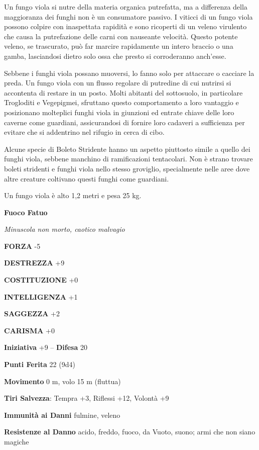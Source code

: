 \begin{multicols}{2}
	Un fungo viola si nutre della materia organica putrefatta, ma a differenza della maggioranza dei funghi non è un consumatore passivo. I viticci di un fungo viola possono colpire con inaspettata rapidità e sono ricoperti di un veleno virulento che causa la putrefazione delle carni con nauseante velocità. Questo potente veleno, se trascurato, può far marcire rapidamente un intero braccio o una gamba, lasciandosi dietro solo ossa che presto si corroderanno anch'esse.

	Sebbene i funghi viola possano muoversi, lo fanno solo per attaccare o cacciare la preda. Un fungo viola con un flusso regolare di putredine di cui nutrirsi si accontenta di restare in un posto. Molti abitanti del sottosuolo, in particolare Trogloditi e Vegepigmei, sfruttano questo comportamento a loro vantaggio e posizionano molteplici funghi viola in giunzioni ed entrate chiave delle loro caverne come guardiani, assicurandosi di fornire loro cadaveri a sufficienza per evitare che si addentrino nel rifugio in cerca di cibo.

	Alcune specie di Boleto Stridente hanno un aspetto piuttosto simile a quello dei funghi viola, sebbene manchino di ramificazioni tentacolari. Non è strano trovare boleti stridenti e funghi viola nello stesso groviglio, specialmente nelle aree dove altre creature coltivano questi funghi come guardiani.

	Un fungo viola è alto 1,2 metri e pesa 25 kg.


	\medskip{}\textbf{Fuoco Fatuo}

	\textit{Minuscola non morto, caotico malvagio}

	\textbf{FORZA} -5

	\textbf{DESTREZZA} +9

	\textbf{COSTITUZIONE} +0

	\textbf{INTELLIGENZA} +1

	\textbf{SAGGEZZA} +2

	\textbf{CARISMA} +0

	\textbf{Iniziativa} +9 -- \textbf{Difesa} 20

	\textbf{Punti Ferita} 22 (9d4)

	\textbf{Movimento} 0 m, volo 15 m (fluttua)

	\textbf{Tiri Salvezza}: Tempra +3, Riflessi +12, Volontà +9

	\textbf{Immunità ai Danni} fulmine, veleno

	\textbf{Resistenze al Danno} acido, freddo, fuoco, da Vuoto, suono; armi che non siano magiche


\end{multicols}
